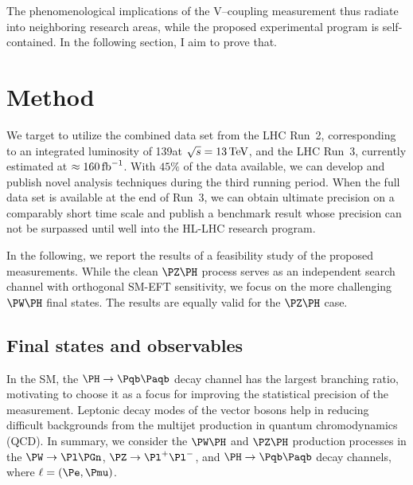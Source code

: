 \documentclass[a4paper,11pt]{article}
\newcommand{\Pb}{{{\Pqb}}\xspace}
\newcommand{\PAb}{{{{\Paqb}}}\xspace}
\renewcommand{\PV}{{{{V}}}\xspace}
\begin{document}
The phenomenological implications of the \PV--\PH coupling measurement thus radiate into neighboring research areas, while the proposed experimental program is self-contained.
In the following section, I aim to prove that. 

\section{Method}
\label{sec:method}

We target to utilize the combined data set from the LHC Run~2, corresponding to an integrated luminosity of 139\fbinv at $\sqrt{s}=13\,\text{Te\hspace{-.08em}V}$, and the LHC Run~3, currently estimated at $\approx160\mbox{\ensuremath{\,\text{fb}^{-1}}}$.
With $45\%$ of the data available, we can develop and publish novel analysis techniques during the third running period. 
When the full data set is available at the end of Run~3, we can obtain ultimate precision on a comparably short time scale and publish a benchmark result whose precision can not be surpassed until well into the HL-LHC research program.

In the following, we report the results of a feasibility study of the proposed measurements.
While the clean $\PZ\PH$ process serves as an independent search channel with orthogonal SM-EFT sensitivity, we focus on the more challenging $\PW\PH$ final states.
The results are equally valid for the $\PZ\PH$ case.

\subsection{Final states and observables}

In the SM, the $\PH\rightarrow\Pb \PAb$ decay channel has the largest branching ratio, motivating to choose it as a focus for improving  the statistical precision of the measurement.
Leptonic decay modes of the vector bosons help in reducing difficult backgrounds from the multijet production in quantum chromodynamics (QCD).
In summary, we consider the $\PW\PH$ and $\PZ\PH$ production processes in the $\PW\rightarrow\Pl\Pgn$, $\PZ\rightarrow{\Pl}^{+} {\Pl}^{-}$, and $\PH\rightarrow\Pb\PAb $ decay channels, where $\ell=(\Pe, \Pmu)$.

\end{document}
